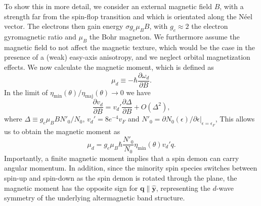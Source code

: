 \documentclass[aps,prl,reprint,twocolumns,superscriptaddress]{revtex4-2}
\newcommand{\deltaq}{\eta_{{\mathrm{min}}}(\theta)/\eta_{{\mathrm{maj}}}(\theta)}
\newcommand{\vs}{v_d}
\begin{document}
	To show this in more detail, we consider an external magnetic field $B$, with a strength far from the spin-flop transition and which is orientated along the N\'{e}el vector. The electrons then gain energy $\sigma g_e\mu_B B$, with $g_e\approx2$ the electron gyromagnetic ratio and $\mu_B$ the Bohr magneton. We furthermore assume the magnetic field to not affect the magnetic texture, which would be the case in the presence of a (weak) easy-axis anisotropy, and we neglect orbital magnetization effects. We now calculate the magnetic moment, which is defined as
	\begin{equation}
		\mu_d \equiv -\hbar\frac{\partial\omega_d}{\partial B}. \label{eq:mud}
	\end{equation}
	In the limit of $\deltaq\rightarrow0$ we have
	\begin{equation}
		\frac{\partial \vs}{\partial B} = \vs' \frac{\partial\Delta}{\partial B} + O(\Delta^2),
	\end{equation}
	where $\Delta\equiv g_e\mu_B B N'_0 /N_0 $, $ \vs'=8e^{-4}v_F$ and $N'_0=\partial N_0(\epsilon)/\partial\epsilon|_{\epsilon=\epsilon_F}$, 
	This allows us to obtain the magnetic moment as
	\begin{equation}
		\mu_d =  g_e\mu_B\hbar \frac{N'_0}{N_0}  \eta_{\mathrm{min}}(\theta)  \vs' q. \label{eq:mup}
	\end{equation}
	Importantly, a finite magnetic moment implies that a spin demon can carry angular momentum. 
	In addition, since the minority spin species switches between spin-up and spin-down as the spin demon is rotated through the plane, the magnetic moment has the opposite sign for $\bm q \parallel \hat{\bm y}$, representing the $d$-wave symmetry of the underlying altermagnetic band structure. 
	
\end{document}
